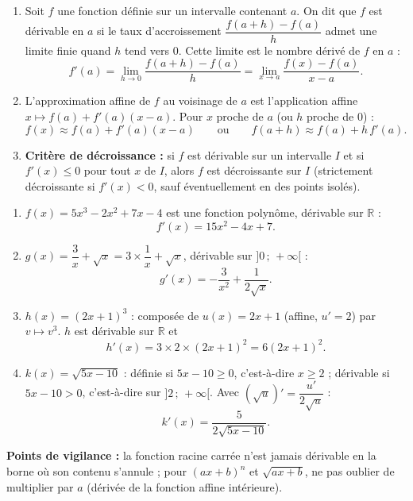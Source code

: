 \documentclass[11pt]{article}
\newcommand{\cle}[1]{{\popxbold\color{popdark}#1}}
\begin{document}
\begin{corrige}
\begin{enumerate}
\item Soit $f$ une fonction définie sur un intervalle contenant $a$. On dit que $f$ est \cle{dérivable en $a$} si le taux d'accroissement $\dfrac{f(a+h)-f(a)}{h}$ admet une limite finie quand $h$ tend vers $0$. Cette limite est le \cle{nombre dérivé} de $f$ en $a$ :
\[ f'(a)=\lim_{h\to 0}\dfrac{f(a+h)-f(a)}{h}=\lim_{x\to a}\dfrac{f(x)-f(a)}{x-a}. \]
\item L'\cle{approximation affine} de $f$ au voisinage de $a$ est l'application affine $x\mapsto f(a)+f'(a)(x-a)$. Pour $x$ proche de $a$ (ou $h$ proche de $0$) :
\[ f(x)\approx f(a)+f'(a)(x-a) \qquad\text{ou}\qquad f(a+h)\approx f(a)+h\,f'(a). \]
\item \textbf{Critère de décroissance :} si $f$ est dérivable sur un intervalle $I$ et si $f'(x)\leq 0$ pour tout $x$ de $I$, alors $f$ est décroissante sur $I$ (strictement décroissante si $f'(x)<0$, sauf éventuellement en des points isolés).
\end{enumerate}
\end{corrige}

\begin{corrige}
\begin{enumerate}
\item $f(x)=5x^3-2x^2+7x-4$ est une fonction polynôme, dérivable sur $\mathbb{R}$ :
\[ f'(x)=15x^2-4x+7. \]
\item $g(x)=\dfrac{3}{x}+\sqrt{x}=3\times\dfrac{1}{x}+\sqrt{x}$, dérivable sur $]0\,;\,+\infty[$ :
\[ g'(x)=-\dfrac{3}{x^2}+\dfrac{1}{2\sqrt{x}}. \]
\item $h(x)=(2x+1)^3$ : composée de $u(x)=2x+1$ (affine, $u'=2$) par $v\mapsto v^3$. $h$ est dérivable sur $\mathbb{R}$ et
\[ h'(x)=3\times 2\times (2x+1)^2=6(2x+1)^2. \]
\item $k(x)=\sqrt{5x-10}$ : définie si $5x-10\geq 0$, c'est-à-dire $x\geq 2$ ; dérivable si $5x-10>0$, c'est-à-dire sur $]2\,;\,+\infty[$. Avec $(\sqrt{u})'=\dfrac{u'}{2\sqrt{u}}$ :
\[ k'(x)=\dfrac{5}{2\sqrt{5x-10}}. \]
\end{enumerate}
\textbf{Points de vigilance :} la fonction racine carrée n'est jamais dérivable en la borne où son contenu s'annule ; pour $(ax+b)^n$ et $\sqrt{ax+b}$, ne pas oublier de multiplier par $a$ (dérivée de la fonction affine intérieure).
\end{corrige}
\end{document}
